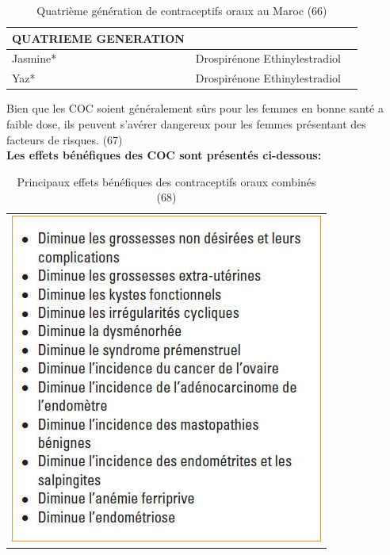 \begin{table}[H]
  \centering
  \renewcommand{\arraystretch}{1.5}
  \begin{spacing}{1.5} %
  \begin{tabularx}{\textwidth}{|X|p{8cm}|X|}
      \hline
      \textbf{QUATRIEME GENERATION} &  \\
      \hline
       
      Jasmine* & Drospirénone \newline Ethinylestradiol
       \\
      \hline
      Yaz* & Drospirénone \newline Ethinylestradiol
      \\
      \hline
  \end{tabularx}
\end{spacing}
  \caption{Quatrième génération de contraceptifs oraux au Maroc (66)}
\end{table}

\noindent Bien que les COC soient généralement sûrs pour les femmes en bonne santé a faible dose, ils peuvent s’avérer dangereux pour les femmes présentant des facteurs de risques. (67)\\

\noindent \textbf{Les effets bénéfiques des COC sont présentés ci-dessous:}

\begin{table}[H]
  \centering
  \begin{tabular}{c}
      \includegraphics[scale=3.5]{Images/tab_6.jpg} \\
  \end{tabular}
  \caption{Principaux effets bénéfiques des contraceptifs oraux combinés (68)}
\end{table}

